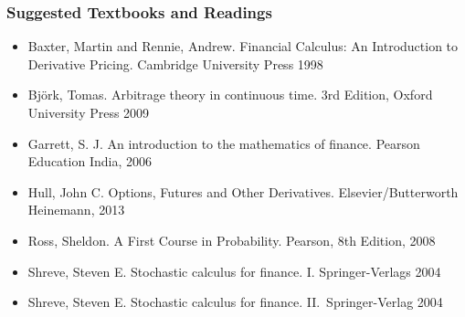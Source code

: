 \documentclass[11pt]{article}
\begin{document}
{  \subsubsection{Suggested Textbooks and Readings}
  \begin{itemize}
    \item Baxter, Martin and Rennie, Andrew. Financial Calculus: An
      Introduction to Derivative Pricing. Cambridge University Press 1998
    \item Björk, Tomas. Arbitrage theory in continuous time. 3rd Edition, Oxford University Press 2009
    \item Garrett, S. J. An introduction to the mathematics of finance. Pearson Education India, 2006
    \item Hull, John C. Options, Futures and Other Derivatives. Elsevier/Butterworth Heinemann, 2013
    \item Ross, Sheldon. A First Course in Probability. Pearson, 8th Edition, 2008
    \item Shreve, Steven E. Stochastic calculus for finance. I. Springer-Verlags 2004
    \item Shreve, Steven E. Stochastic calculus for finance. II.\ Springer-Verlag 2004
  \end{itemize}
}

\microtoc%
\newpage




\end{document}
